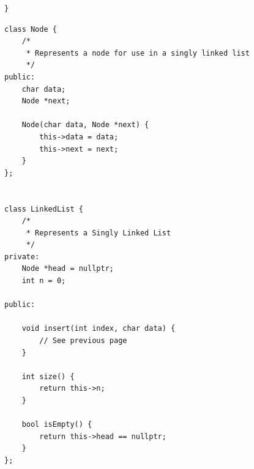 \documentclass[addpoints]{exam}
\begin{document}
\begin{questions}
\begin{verbatim}
	 
	 
	 
	 
	 
	 
	 
	 
	 
	 
	 
	 
	 
	 
	 
	 
	 
	 
	 
	 
	 
	 
	 
	 
	 
	 
	 
	 
	 
	 
	 
	 
}
\end{verbatim}
	\newpage
	\begin{verbatim}
class Node {
    /*
     * Represents a node for use in a singly linked list
     */
public:
    char data;
    Node *next;

    Node(char data, Node *next) {
        this->data = data;
        this->next = next;
    }
};


class LinkedList {
    /*
     * Represents a Singly Linked List
     */
private:
    Node *head = nullptr;
    int n = 0;

public:

    void insert(int index, char data) {
        // See previous page
    }

    int size() {
        return this->n;
    }

    bool isEmpty() {
        return this->head == nullptr;
    }
};
\end{verbatim}


	\newpage







\end{questions}
\end{document}
